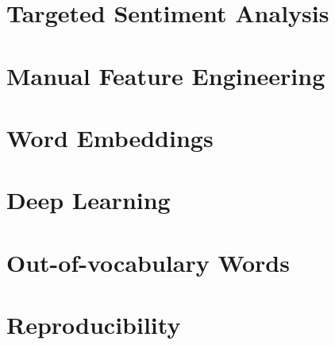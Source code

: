 \documentclass[../../fyp.tex]{subfiles}
\begin{document}
\section{Targeted Sentiment Analysis}


\section{Manual Feature Engineering}


\section{Word Embeddings}


\section{Deep Learning}


\section{Out-of-vocabulary Words}


\section{Reproducibility}

\end{document}
